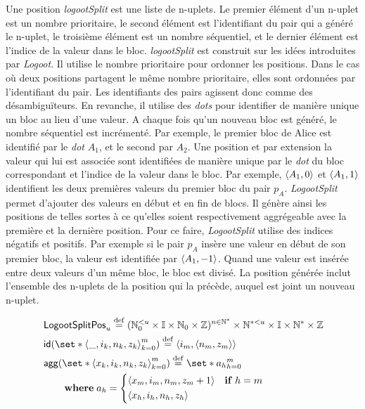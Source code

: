 Une position \emph{logootSplit} est une liste de n-uplets.
Le premier élément d'un n-uplet est un nombre prioritaire, le second élément est l'identifiant du pair qui a généré le n-uplet, le troisième élément est un nombre séquentiel, et le dernier élément est l'indice de la valeur dans le bloc.
\emph{logootSplit} est construit sur les idées introduites par \emph{Logoot}.
Il utilise le nombre prioritaire pour ordonner les positions.
Dans le cas où deux positions partagent le même nombre prioritaire, elles sont ordonnées par l'identifiant du pair.
Les identifiants des pairs agissent donc comme des désambiguïteurs.
En revanche, il utilise des \emph{dots} pour identifier de manière unique un bloc au lieu d'une valeur.
A chaque fois qu'un nouveau bloc est généré, le nombre séquentiel est incrémenté.
Par exemple, le premier bloc de Alice est identifié par le \emph{dot} $A_1$, et le second par $A_2$.
Une position et par extension la valeur qui lui est associée sont identifiées de manière unique par le \emph{dot} du bloc correspondant et l'indice de la valeur dans le bloc.
Par exemple, $\tuple*{A_1,0}$ et $\tuple*{A_1,1}$ identifient les deux premières valeurs du premier bloc du pair $p_A$.
\emph{LogootSplit} permet d'ajouter des valeurs en début et en fin de blocs.
Il génère ainsi les positions de telles sortes à ce qu'elles soient respectivement aggrégeable avec la première et la dernière position.
Pour ce faire, \emph{LogootSplit} utilise des indices négatifs et positifs.
Par exemple si le pair $p_A$ insère une valeur en début de son premier bloc, la valeur est identifiée par $\tuple*{A_1,-1}$.
Quand une valeur est insérée entre deux valeurs d'un même bloc, le bloc est divisé.
La position générée inclut l'ensemble des n-uplets de la position qui la précède, auquel est joint un nouveau n-uplet.

\begin{align*}
&\trm{LogootSplitPos}_u \defeq (\mathbb{N}_0^{< u} \times \mathbb{I} \times \mathbb{N}_0 \times \mathbb{Z})^{n \in \mathbb{N}^*} \times \mathbb{N}^{* < u} \times \mathbb{I} \times \mathbb{N}^* \times \mathbb{Z}\\
&\trm{id}(\set*{\tuple*{\_, i_k, n_k, z_k}}_{k=0}^m) \defeq \tuple*{i_m, \tuple*{n_m, z_m}}\\
&\begin{aligned}
    \MoveEqLeft \trm{agg}(\set*{\tuple*{x_k, i_k, n_k, z_k}}_{k=0}^m) \defeq \set*{a_h}_{h=0}^m\\
    &\where a_h = \begin{dcases}
        \tuple*{x_m, i_m, n_m, z_m + 1} & \when h = m\\
        \tuple*{x_h, i_h, n_h, z_h}
    \end{dcases}
\end{aligned}
\end{align*}

